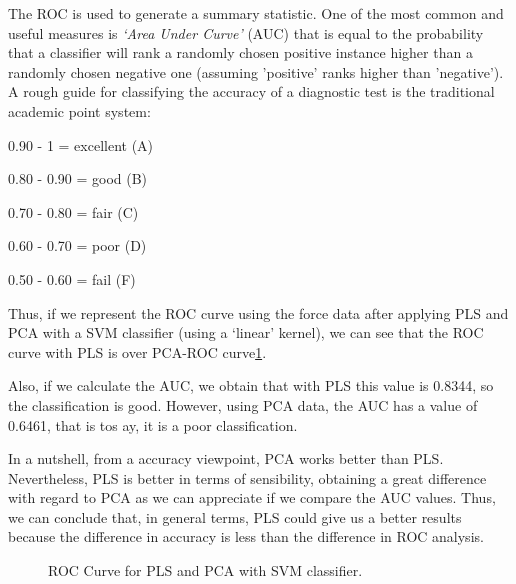 The ROC is used to generate a summary statistic. One of the most common and useful measures is \textit{‘Area Under Curve’} (AUC) that is equal to the probability that a classifier will rank a randomly chosen positive instance higher than a randomly chosen negative one (assuming 'positive' ranks higher than 'negative'). A rough guide for classifying the accuracy of a diagnostic test is the traditional academic point system\cite{ROC2}:

0.90 - 1 = excellent (A)

0.80 - 0.90 = good (B)	

0.70 - 0.80 = fair (C)

0.60 - 0.70 = poor (D)

0.50 - 0.60 = fail (F)

Thus, if we represent the ROC curve using the force data after applying PLS and PCA with a SVM classifier (using a ‘linear’ kernel), we can see that the ROC curve with PLS is over PCA-ROC curve\ref{fig:ROC}.

Also, if we calculate the AUC, we obtain that with PLS this value is 0.8344, so the classification is good. However, using PCA data, the AUC has a value of 0.6461, that is tos ay, it is a poor classification.

In a nutshell, from a accuracy viewpoint, PCA works better than PLS. Nevertheless, PLS is better in terms of sensibility, obtaining a great difference with regard to PCA as we can appreciate if we compare the AUC values. Thus, we can conclude that, in general terms, PLS could give us a better results because the difference in accuracy is less than the difference in ROC analysis.

\begin{figure}[H]
	\centering
	\caption{ROC Curve for PLS and PCA with SVM classifier.}
	\label{fig:ROC}
\end{figure}

 
